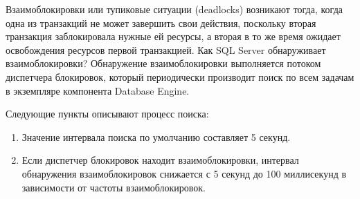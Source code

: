 Взаимоблокировки или тупиковые ситуации (deadlocks) возникают тогда, когда одна из транзакций не может завершить свои действия, поскольку вторая транзакция заблокировала нужные ей ресурсы, а вторая в то же время ожидает освобождения ресурсов первой транзакцией. Как SQL Server обнаруживает взаимоблокировки? Обнаружение взаимоблокировки выполняется потоком диспетчера блокировок, который периодически производит поиск по всем задачам в экземпляре компонента Database Engine.


Следующие пункты описывают процесс поиска:

\begin{enumerate}
	\item Значение интервала поиска по умолчанию составляет 5 секунд.
	\item Если диспетчер блокировок находит взаимоблокировки, интервал обнаружения взаимоблокировок снижается с 5 секунд до 100 миллисекунд в зависимости от частоты взаимоблокировок.
	

\end{enumerate}
